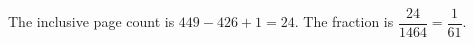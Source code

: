 The inclusive page count is $ 449-426+1=24 $. The fraction is $\dfrac{24}{1464}=\boxed{\dfrac{1}{61}}$.
